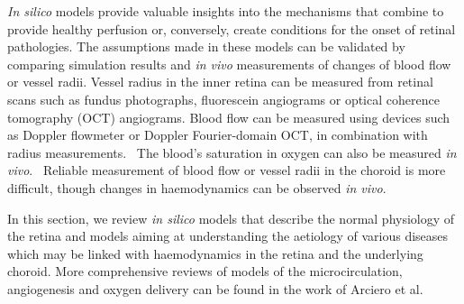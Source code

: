 \documentclass[12pt,a4paper]{journal}
\begin{document}
\textit{In silico} models provide valuable insights into the mechanisms that combine to provide healthy perfusion or, conversely, create conditions for the onset of retinal pathologies.
The assumptions made in these models can be validated by comparing simulation results and \textit{in vivo} measurements of changes of blood flow or vessel radii.
Vessel radius in the inner retina can be measured from retinal scans such as fundus photographs, fluorescein angiograms or optical coherence tomography (OCT) angiograms.
Blood flow can be measured using devices such as Doppler flowmeter or Doppler Fourier-domain OCT, in combination with radius measurements.~\cite{DoblhoffDier_2014,Wang_2009}
The blood's saturation in oxygen can also be measured \textit{in vivo}.~\cite{Geirsdottir_2013}
Reliable measurement of blood flow or vessel radii in the choroid is more difficult, though changes in haemodynamics can be observed \textit{in vivo}.~\cite{Riva_1997,Scherm_2019}

In this section, we review \textit{in silico} models that describe the normal physiology of the retina and models aiming at understanding the aetiology of various diseases which may be linked with haemodynamics in the retina and the underlying choroid.
More comprehensive reviews of models of the microcirculation, angiogenesis and oxygen delivery can be found in the work of Arciero et al.~\cite{Arciero_2017, Arciero_2019}
\end{document}
